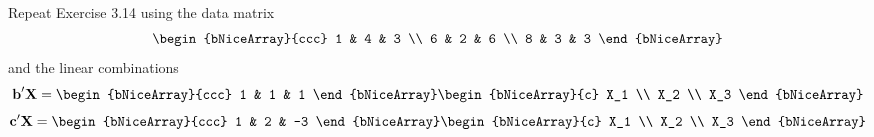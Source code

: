 Repeat Exercise 3.14 using the data matrix
\[
    \begin{bNiceArray}{ccc}
        1 & 4 & 3 \\
        6 & 2 & 6 \\
        8 & 3 & 3
    \end{bNiceArray}
\]
and the linear combinations
\[
    \textbf{b}^{\prime}\textbf{X}
    =
    \begin{bNiceArray}{ccc}
        1 & 1 & 1
    \end{bNiceArray}
    \begin{bNiceArray}{c}
        X_1 \\
        X_2 \\
        X_3
    \end{bNiceArray}
\]
\[
    \textbf{c}^{\prime}\textbf{X}
    =
    \begin{bNiceArray}{ccc}
        1 & 2 & -3
    \end{bNiceArray}
    \begin{bNiceArray}{c}
        X_1 \\
        X_2 \\
        X_3
    \end{bNiceArray}
\]
